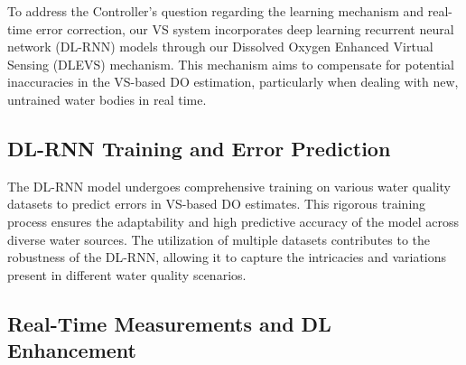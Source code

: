 \documentclass[a4paper, 11pt]{article}
\begin{document}
	To address the Controller's question regarding the learning mechanism and real-time error correction, our VS system incorporates deep learning recurrent neural network (DL-RNN) models through our Dissolved Oxygen Enhanced Virtual Sensing (DLEVS) mechanism. This mechanism aims to compensate for potential inaccuracies in the VS-based DO estimation, particularly when dealing with new, untrained water bodies in real time.
	
	\subsection*{DL-RNN Training and Error Prediction}
	
	The DL-RNN model undergoes comprehensive training on various water quality datasets to predict errors in VS-based DO estimates. This rigorous training process ensures the adaptability and high predictive accuracy of the model across diverse water sources. The utilization of multiple datasets contributes to the robustness of the DL-RNN, allowing it to capture the intricacies and variations present in different water quality scenarios.
	
%	
%	
%	
	
	\subsection*{Real-Time Measurements and DL Enhancement}
	
\end{document}
